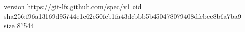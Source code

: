 version https://git-lfs.github.com/spec/v1
oid sha256:f96a13169d95744e1c62e50fcb1fa43dcbbb5b450478079408dfebee8b6a7ba9
size 87544

